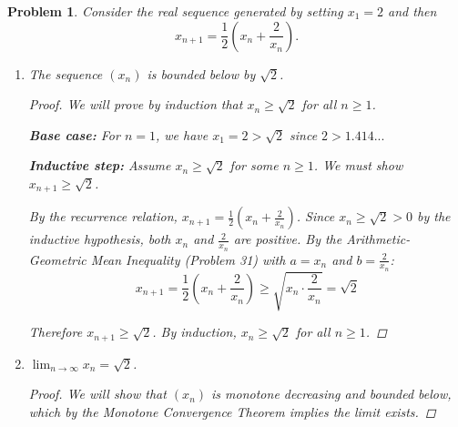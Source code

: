 \documentclass[12pt]{article}
\newtheorem{problem}{Problem}
\begin{document}
\begin{problem} %
Consider the real sequence generated by setting $x_1=2$ and then
	$$x_{n+1} = \frac{1}{2}\left(x_n + \frac{2}{x_n}\right).$$

%

\renewcommand{\labelenumi}{(\alph{enumi})}
\begin{enumerate}
\item The sequence $(x_n)$ is bounded below by $\sqrt{2}$.

\begin{proof}
We will prove by induction that $x_n \geq \sqrt{2}$ for all $n \geq 1$.

\textbf{Base case:} For $n = 1$, we have $x_1 = 2 > \sqrt{2}$ since $2 > 1.414...$

\textbf{Inductive step:} Assume $x_n \geq \sqrt{2}$ for some $n \geq 1$. We must show $x_{n+1} \geq \sqrt{2}$.

By the recurrence relation, $x_{n+1} = \frac{1}{2}\left(x_n + \frac{2}{x_n}\right)$. Since $x_n \geq \sqrt{2} > 0$ by the inductive hypothesis, both $x_n$ and $\frac{2}{x_n}$ are positive. By the Arithmetic-Geometric Mean Inequality (Problem 31) with $a = x_n$ and $b = \frac{2}{x_n}$:
$$x_{n+1} = \frac{1}{2}\left(x_n + \frac{2}{x_n}\right) \geq \sqrt{x_n \cdot \frac{2}{x_n}} = \sqrt{2}$$

Therefore $x_{n+1} \geq \sqrt{2}$. By induction, $x_n \geq \sqrt{2}$ for all $n \geq 1$.
\end{proof}

\item $\lim_{n\to\infty} x_n = \sqrt{2}$.

\begin{proof}
We will show that $(x_n)$ is monotone decreasing and bounded below, which by the Monotone Convergence Theorem implies the limit exists.


\end{proof}
\end{enumerate}
\end{problem}
\end{document}
